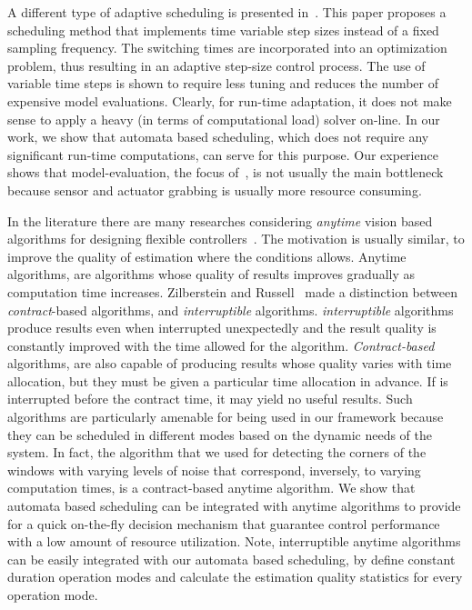 \documentclass[ twoside, 12pt ]{article}
\begin{document}
A different type of adaptive scheduling is presented in~\cite{kowalska2012approach}.
This paper proposes a scheduling method that implements time variable step sizes instead of a fixed sampling frequency. The switching times are incorporated into an optimization problem, thus resulting in an adaptive step-size control process. The use of variable time steps is shown to require less tuning and reduces the number of expensive model evaluations. 
Clearly, for run-time adaptation, it does not make sense to apply a heavy (in terms of computational load) solver on-line. In our work, we show that automata based scheduling, which does not require any significant run-time computations, can serve for this purpose. Our experience shows that model-evaluation, the focus of~\cite{kowalska2012approach}, is not usually the main bottleneck because sensor and actuator grabbing is usually more resource consuming.

In the literature there are many researches considering \textit{anytime} vision based algorithms for designing flexible controllers~\cite{Shlomo, arzen2000introduction, pant2015co, greco2011design, quevedo2013sequence}. 
The motivation is usually similar, to improve the quality of estimation where the conditions allows.
Anytime algorithms, are algorithms whose quality of results improves gradually as computation time increases.
Zilberstein and Russell~\cite{Shlomo} made a distinction between \textit{contract}-based algorithms, and \textit{interruptible} algorithms.
\textit{interruptible} algorithms produce results even when interrupted unexpectedly and the result quality is constantly improved with the time allowed for the algorithm.
\textit{Contract-based } algorithms, are also capable of producing results whose quality varies with time allocation, but they must be given a particular time allocation in advance. If is interrupted before the contract time, it may yield no useful results. Such algorithms are particularly amenable for being used in our framework because they can be scheduled in different modes based on the dynamic needs of the system.
In fact, the algorithm that we used for detecting the corners of the windows with varying levels of noise that correspond, inversely, to varying computation times, is a contract-based anytime algorithm. We show that automata based scheduling can be integrated with anytime algorithms to provide for a quick on-the-fly decision mechanism that guarantee control performance with a low amount of resource utilization. Note, interruptible anytime algorithms can be easily integrated with our automata based scheduling, by define constant duration operation modes and calculate the estimation quality statistics for every operation mode.
\end{document}
